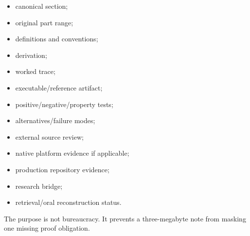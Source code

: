 \begin{itemize}
\tightlist
\item
  canonical section;
\item
  original part range;
\item
  definitions and conventions;
\item
  derivation;
\item
  worked trace;
\item
  executable/reference artifact;
\item
  positive/negative/property tests;
\item
  alternatives/failure modes;
\item
  external source review;
\item
  native platform evidence if applicable;
\item
  production repository evidence;
\item
  research bridge;
\item
  retrieval/oral reconstruction status.
\end{itemize}

The purpose is not bureaucracy. It prevents a three-megabyte note from masking one missing proof obligation.
